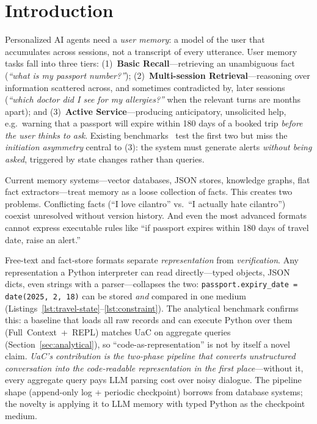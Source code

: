 \section{Introduction}
\label{sec:intro}

Personalized AI agents need a \emph{user memory}: a model of the user that accumulates across sessions, not a transcript of every utterance. User memory tasks fall into three tiers: (1)~\textbf{Basic Recall}---retrieving an unambiguous fact (\emph{``what is my passport number?''}); (2)~\textbf{Multi-session Retrieval}---reasoning over information scattered across, and sometimes contradicted by, later sessions (\emph{``which doctor did I see for my allergies?''} when the relevant turns are months apart); and (3)~\textbf{Active Service}---producing anticipatory, unsolicited help, e.g.\ warning that a passport will expire within 180 days of a booked trip \emph{before the user thinks to ask}. Existing benchmarks~\citep{maharana2024locomo, wu2025longmemeval, hu2025memoryagentbench} test the first two but miss the \emph{initiation asymmetry} central to (3): the system must generate alerts \emph{without being asked}, triggered by state changes rather than queries.

Current memory systems---vector databases, JSON stores, knowledge graphs, flat fact extractors---treat memory as a loose collection of facts. This creates two problems. Conflicting facts (``I love cilantro'' vs.\ ``I actually hate cilantro'') coexist unresolved without version history. And even the most advanced formats cannot express executable rules like ``if passport expires within 180 days of travel date, raise an alert.''

Free-text and fact-store formats separate \emph{representation} from \emph{verification}. Any representation a Python interpreter can read directly---typed objects, JSON dicts, even strings with a parser---collapses the two: \texttt{passport.expiry\_date = date(2025, 2, 18)} can be stored \emph{and} compared in one medium (Listings~\ref{lst:travel-state}--\ref{lst:constraint}). The analytical benchmark confirms this: a baseline that loads all raw records and can execute Python over them (Full~Context~+~REPL) matches UaC on aggregate queries (Section~\ref{sec:analytical}), so ``code-as-representation'' is not by itself a novel claim. \emph{UaC's contribution is the two-phase pipeline that converts unstructured conversation into the code-readable representation in the first place}---without it, every aggregate query pays LLM parsing cost over noisy dialogue. The pipeline shape (append-only log + periodic checkpoint) borrows from database systems; the novelty is applying it to LLM memory with typed Python as the checkpoint medium.

